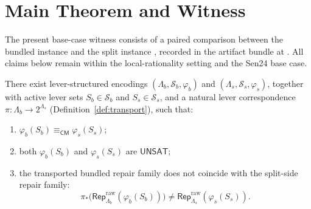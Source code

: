\section{Main Theorem and Witness}
\label{sec:theorem}

The present base-case witness consists of a paired comparison between the bundled instance
and the split instance
,
recorded in the artifact bundle at
.
All claims below remain within the local-rationality setting and the Sen24 base case.

\begin{theorem}
\label{thm:non-invariance}
There exist lever-structured encodings $(\Lambda_b,\mathcal{S}_b,\varphi_b)$ and $(\Lambda_s,\mathcal{S}_s,\varphi_s)$, together with active lever sets $S_b \in \mathcal{S}_b$ and $S_s \in \mathcal{S}_s$, and a natural lever correspondence $\pi : \Lambda_b \to 2^{\Lambda_s}$ (Definition~\ref{def:transport}), such that:
\begin{enumerate}[label=(\arabic*),leftmargin=1.8em]
\item $\varphi_b(S_b) \equiv_{\mathsf{CM}} \varphi_s(S_s)$;
\item both $\varphi_b(S_b)$ and $\varphi_s(S_s)$ are $\mathsf{UNSAT}$;
\item the transported bundled repair family does not coincide with the split-side repair family:
\[
  \pi_*\!\bigl(\mathsf{Rep}^{\mathrm{raw}}_{\Lambda_b}(\varphi_b(S_b))\bigr)
  \neq
  \mathsf{Rep}^{\mathrm{raw}}_{\Lambda_s}(\varphi_s(S_s)).
\]
\end{enumerate}
\end{theorem}

